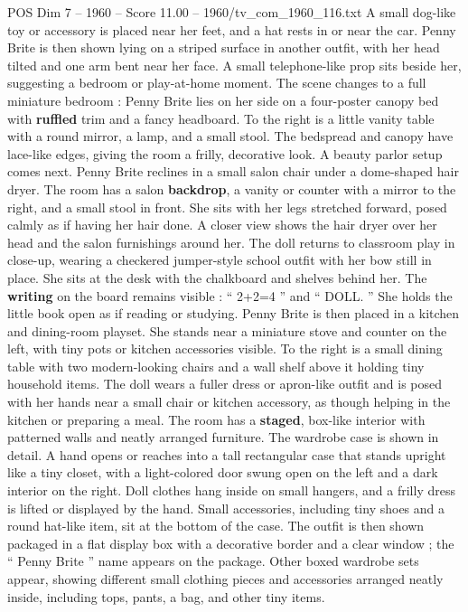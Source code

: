 \begin{textsample}{POS Dim 7 – 1960 – Score 11.00 – 1960/tv\_com\_1960\_116.txt}
A small dog-like toy or accessory is placed near her feet, and a hat rests in or near the car.
Penny Brite is then shown lying on a striped surface in another outfit, with her head tilted and one arm bent near her face.
A small telephone-like prop sits beside her, suggesting a bedroom or play-at-home moment.
The scene changes to a full miniature bedroom : Penny Brite lies on her side on a four-poster canopy bed with \textbf{ruffled} trim and a fancy headboard.
To the right is a little vanity table with a round mirror, a lamp, and a small stool.
The bedspread and canopy have lace-like edges, giving the room a frilly, decorative look.
A beauty parlor setup comes next.
Penny Brite reclines in a small salon chair under a dome-shaped hair dryer.
The room has a salon \textbf{backdrop}, a vanity or counter with a mirror to the right, and a small stool in front.
She sits with her legs stretched forward, posed calmly as if having her hair done.
A closer view shows the hair dryer over her head and the salon furnishings around her.
The doll returns to classroom play in close-up, wearing a checkered jumper-style school outfit with her bow still in place.
She sits at the desk with the chalkboard and shelves behind her.
The \textbf{writing} on the board remains visible : “ 2+2=4 ” and “ DOLL. ” She holds the little book open as if reading or studying.
Penny Brite is then placed in a kitchen and dining-room playset.
She stands near a miniature stove and counter on the left, with tiny pots or kitchen accessories visible.
To the right is a small dining table with two modern-looking chairs and a wall shelf above it holding tiny household items.
The doll wears a fuller dress or apron-like outfit and is posed with her hands near a small chair or kitchen accessory, as though helping in the kitchen or preparing a meal.
The room has a \textbf{staged}, box-like interior with patterned walls and neatly arranged furniture.
The wardrobe case is shown in detail.
A hand opens or reaches into a tall rectangular case that stands upright like a tiny closet, with a light-colored door swung open on the left and a dark interior on the right.
Doll clothes hang inside on small hangers, and a frilly dress is lifted or displayed by the hand.
Small accessories, including tiny shoes and a round hat-like item, sit at the bottom of the case.
The outfit is then shown packaged in a flat display box with a decorative border and a clear window ; the “ Penny Brite ” name appears on the package.
Other boxed wardrobe sets appear, showing different small clothing pieces and accessories arranged neatly inside, including tops, pants, a bag, and other tiny items.

\end{textsample}
